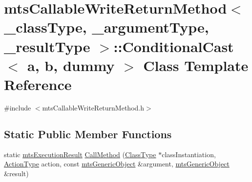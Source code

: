 \hypertarget{classmts_callable_write_return_method_1_1_conditional_cast}{\section{mts\-Callable\-Write\-Return\-Method$<$ \-\_\-class\-Type, \-\_\-argument\-Type, \-\_\-result\-Type $>$\-:\-:Conditional\-Cast$<$ a, b, dummy $>$ Class Template Reference}
\label{classmts_callable_write_return_method_1_1_conditional_cast}
}


{\ttfamily \#include $<$mts\-Callable\-Write\-Return\-Method.\-h$>$}

\subsection*{Static Public Member Functions}
\begin{DoxyCompactItemize}
\item 
static \hyperlink{classmts_execution_result}{mts\-Execution\-Result} \hyperlink{classmts_callable_write_return_method_1_1_conditional_cast_a09bbeecbf815ac72ff2ad0070f71f98a}{Call\-Method} (\hyperlink{classmts_callable_write_return_method_a51dbe6298941ab172d83182c8188092d}{Class\-Type} $\ast$class\-Instantiation, \hyperlink{classmts_callable_write_return_method_a0b5f9726e52abdb0790ccd8c217591b2}{Action\-Type} action, const \hyperlink{classmts_generic_object}{mts\-Generic\-Object} \&argument, \hyperlink{classmts_generic_object}{mts\-Generic\-Object} \&result)
\end{DoxyCompactItemize}


